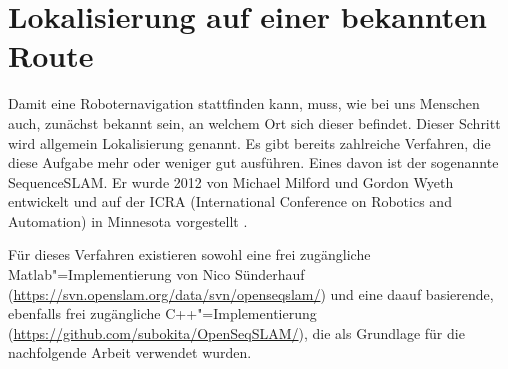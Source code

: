 \documentclass[12pt,a4paper,titlepage]{scrartcl}
\begin{document}
%
%

\pagebreak
\pagebreak
\section{Lokalisierung auf einer bekannten Route}
Damit eine Roboternavigation stattfinden kann, muss, wie bei uns Menschen auch, zunächst bekannt sein, an welchem Ort sich dieser befindet. Dieser Schritt wird allgemein Lokalisierung genannt. Es gibt bereits zahlreiche Verfahren, die diese Aufgabe mehr oder weniger gut ausführen. Eines davon ist der sogenannte SequenceSLAM. Er wurde 2012 von Michael Milford und Gordon Wyeth entwickelt und auf der ICRA (International Conference on Robotics and Automation) in Minnesota vorgestellt \cite{milford2012seqslam}. 

Für dieses Verfahren existieren sowohl eine frei zugängliche Matlab"=Implementierung von Nico Sünderhauf (\url{https://svn.openslam.org/data/svn/openseqslam/}) und eine daauf basierende, ebenfalls frei zugängliche C++"=Implementierung (\url{https://github.com/subokita/OpenSeqSLAM/}), die als Grundlage für die nachfolgende Arbeit verwendet wurden.
\end{document}
